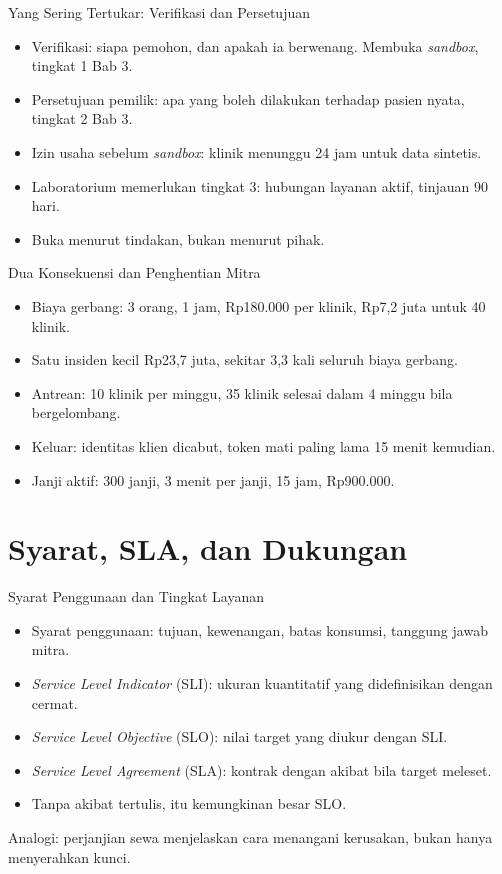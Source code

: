 \documentclass[aspectratio=169, table, 12pt]{beamer}
\begin{document}
\begin{frame}{{\Large Yang Sering Tertukar: Verifikasi dan Persetujuan}}
  \vspace{8pt}
  \begin{itemize}
    \item Verifikasi: siapa pemohon, dan apakah ia berwenang. Membuka \textit{sandbox}, tingkat 1 Bab 3.
    \item Persetujuan pemilik: apa yang boleh dilakukan terhadap pasien nyata, tingkat 2 Bab 3.
    \item Izin usaha sebelum \textit{sandbox}: klinik menunggu 24 jam untuk data sintetis.
    \item Laboratorium memerlukan tingkat 3: hubungan layanan aktif, tinjauan 90 hari.
    \item Buka menurut tindakan, bukan menurut pihak.
  \end{itemize}
\end{frame}

\begin{frame}{{\Large Dua Konsekuensi dan Penghentian Mitra}}
  \vspace{8pt}
  \begin{itemize}
    \item Biaya gerbang: 3 orang, 1 jam, Rp180.000 per klinik, Rp7,2 juta untuk 40 klinik.
    \item Satu insiden kecil Rp23,7 juta, sekitar 3,3 kali seluruh biaya gerbang.
    \item Antrean: 10 klinik per minggu, 35 klinik selesai dalam 4 minggu bila bergelombang.
    \item Keluar: identitas klien dicabut, token mati paling lama 15 menit kemudian.
    \item Janji aktif: 300 janji, 3 menit per janji, 15 jam, Rp900.000.
  \end{itemize}
\end{frame}

\section{Syarat, SLA, dan Dukungan}

\begin{frame}{{\Large Syarat Penggunaan dan Tingkat Layanan}}
  \vspace{8pt}
  \begin{itemize}
    \item Syarat penggunaan: tujuan, kewenangan, batas konsumsi, tanggung jawab mitra.
    \item \textit{Service Level Indicator} (SLI): ukuran kuantitatif yang didefinisikan dengan cermat.
    \item \textit{Service Level Objective} (SLO): nilai target yang diukur dengan SLI.
    \item \textit{Service Level Agreement} (SLA): kontrak dengan akibat bila target meleset.
    \item Tanpa akibat tertulis, itu kemungkinan besar SLO.
  \end{itemize}
  \vspace{6pt}
  {\small Analogi: perjanjian sewa menjelaskan cara menangani kerusakan, bukan hanya menyerahkan kunci.}
\end{frame}
\end{document}
